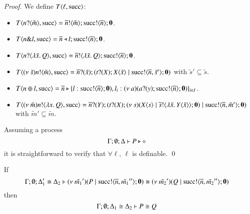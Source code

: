 \begin{proof}
	\noi We define $T\langle \ell, \textrm{succ} \rangle$:
%
	\begin{itemize}
		\item	$T\langle n ? \langle \tilde{m} \rangle, \textrm{succ} \rangle = \overline{n} ! \langle \tilde{m} \rangle ; \textrm{succ} ! \langle \overline{n} \rangle ; \mathbf{0}$.

		\item	$T\langle n \& l, \textrm{succ} \rangle = \overline{n} \triangleleft l ; \textrm{succ} ! \langle \overline{n} \rangle ; \mathbf{0}$.

		\item	$T\langle n ? \langle \lambda \tilde{x}.\,Q \rangle, \textrm{succ} \rangle = \overline{n} ! \langle \lambda \tilde{x}.\,Q \rangle ; \textrm{succ} ! \langle \overline{n} \rangle ; \mathbf{0}$.

		\item	$T\langle (\nu\ \tilde{s}) n ! \langle \tilde{m} \rangle, \textrm{succ} \rangle = \overline{n} ? (\tilde{x}) ; (t ? (X) ; X\langle \tilde{x} \rangle \;|\; \textrm{succ} ! \langle \overline{n}, \tilde{s}' \rangle ; \mathbf{0})$
			with $\tilde{s}' \subseteq \tilde{s}$.

		\item	$T\langle n \oplus l, \textrm{succ} \rangle = \overline{n} \triangleright \{l: \textrm{succ} ! \langle \overline{n} \rangle ; \mathbf{0}), l_i: (\nu\ a)(a ? (y) ; \textrm{succ} ! \langle \overline{n} \rangle ; \mathbf{0})\}_{i \in I}$.

		\item	$T\langle (\nu\ \tilde{m}) n ! \langle \lambda x.\,Q \rangle, \textrm{succ} \rangle = \overline{n} ? (Y) ; (t ? (X) ; (\nu\ s)(X\langle s \rangle \;|\; \overline{s} ! \langle \lambda \tilde{x}.\,Y\langle \tilde{x} \rangle \rangle ; \mathbf{0}) \;|\; \textrm{succ} ! \langle \overline{n}, \tilde{m}' \rangle ; \mathbf{0})$ with $\tilde{m}' \subseteq \tilde{m}$.
	\end{itemize}

	\noi Assuming a process 
	\[
		\Gamma; \emptyset; \Delta \vdash P \triangleright \diamond
	\] 
	\noi it is straightforward to verify that $\forall \ell$, $\ell$ is definable.
	\qed
\end{proof}

\begin{lemma}[Extrusion]\rm
	\label{lem:extrusion}
	If 
	\[
		\Gamma; \emptyset; \Delta_1' \cong \Delta_2 \vdash (\nu\ \tilde{m_1}')(P \;|\; \textrm{succ} ! \langle \overline{n}, \tilde{m_1}'' \rangle ; \mathbf{0}) \cong (\nu\ \tilde{m_2}')(Q \;|\; \textrm{succ} ! \langle \overline{n}, \tilde{m_2}'' \rangle ; \mathbf{0})
	\]
	then
	\[
		\Gamma; \emptyset; \Delta_1 \cong \Delta_2 \vdash P \cong Q
	\]
\end{lemma}

